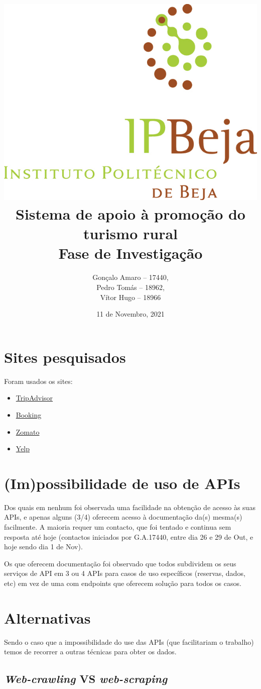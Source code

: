 \documentclass[a4paper,10pt]{article}
\title{\includegraphics[scale=0.5]{ipbeja_logo.png}\\[0.5cm]Sistema de apoio à promoção do turismo rural\\Fase de Investigação} %
\author{Gonçalo Amaro -- 17440,\\ Pedro Tomás -- 18962,\\ Vítor Hugo -- 18966} %
\date{11 de Novembro, 2021} %
\begin{document}
\maketitle

\newpage

{
  \hypersetup{linkcolor=black}
  \tableofcontents
}

\newpage

\section{Sites pesquisados}

Foram usados os sites:
\begin{itemize}
    \item \href{https://www.tripadvisor.com/}{TripAdvisor}
    \item \href{https://www.booking.com/}{Booking}
    \item \href{https://www.zomato.com/}{Zomato}
    \item \href{https://www.yelp.com/}{Yelp}
\end{itemize}

\section{(Im)possibilidade de uso de APIs}

Dos quais em nenhum foi observada uma facilidade na obtenção de acesso às suas APIs, e apenas alguns (3/4) oferecem acesso à documentação da(s) mesma(s) facilmente.
A maioria requer um contacto, que foi tentado e continua sem resposta até hoje (contactos iniciados por G.A.17440, entre dia 26 e 29 de Out, e hoje sendo dia 1 de Nov).

Os que oferecem documentação foi observado que todos subdividem os seus serviços de API em 3 ou 4 APIs para casos de uso específicos (reservas, dados, etc) em vez de uma com endpoints que oferecem solução para todos os casos.

\section{Alternativas}

Sendo o caso que a impossibilidade do use das APIs (que facilitariam o trabalho) temos de recorrer a outras técnicas para obter os dados.

\subsection{\textit{Web-crawling} VS \textit{web-scraping}}
\end{document}
